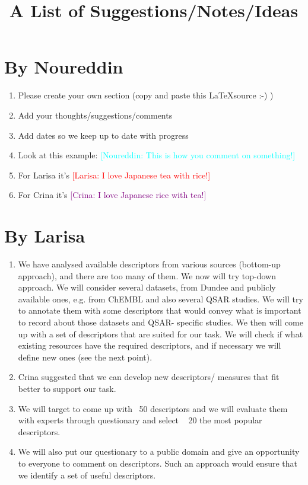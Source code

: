 \documentclass[a4paper,12pt, english]{article}
\newcommand{\kibitz}[2]{\ifnum\Comments=1\textcolor{#1}{#2}\fi}
\newcommand{\ls}[1]{\kibitz{red}      {[Larisa: #1]}}
\newcommand{\cg}[1]  {\kibitz{purple}   {[Crina: #1]}}
\newcommand{\ns}[1]{\kibitz{cyan}     {[Noureddin: #1]}}
\begin{document}
\title{A List of Suggestions/Notes/Ideas}

\large
\section{By Noureddin}
\begin{enumerate}
	\item Please create your own section (copy and paste this \LaTeX  source :-) )
	\item Add your thoughts/suggestions/comments
	\item Add dates so we keep up to date with progress
	\item Look at this example: \ns{This is how you comment on something!}
	\item For Larisa it's \ls{I love Japanese tea with rice!}
	\item For Crina it's  \cg{I love Japanese rice with tea!}
\end{enumerate}    

\section{By Larisa}
\begin{enumerate}
	\item We have analysed available descriptors from various sources (bottom-up approach), and there are too many of them. We now will try top-down approach. We will consider several datasets, from Dundee and publicly available ones, e.g. from ChEMBL and also several QSAR studies. We will try to annotate them with some descriptors that would convey what is important to record about those datasets and QSAR- specific studies. We then will come up with a set of descriptors that are suited for our task. We will check if what existing resources have the required descriptors, and if necessary we will define new ones (see the next point).
	\item Crina suggested that we can develop new descriptors/ measures that fit better to support our task.
	\item We will target to come up with ~50 descriptors and we will evaluate them with experts through questionary and select  ~ 20 the most popular descriptors.
	\item We will also put our questionary to a public domain and give an opportunity to everyone to comment on descriptors. Such an approach would ensure that we identify a set of useful descriptors.
	\end{enumerate}  
		
\end{document}

